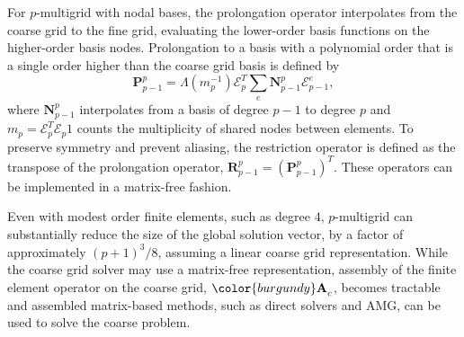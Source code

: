 For $p$-multigrid with nodal bases, the prolongation operator interpolates from the coarse grid to the fine grid, evaluating the lower-order basis functions on the higher-order basis nodes.
Prolongation to a basis with a polynomial order that is a single order higher than the coarse grid basis is defined by
\begin{equation}
\mathbf{P}_{p - 1}^p = \Lambda \left( m_p^{-1} \right) \mathcal{E}_p^T \sum_e \mathbf{N}_{p - 1}^p \mathcal{E}^e_{p - 1},
\label{mg_prolong}
\end{equation}
where $\mathbf{N}_{p - 1}^p$ interpolates from a basis of degree $p - 1$ to degree $p$ and $m_p = \mathcal{E}_p^T \mathcal{E}_p 1$ counts the multiplicity of shared nodes between elements.
To preserve symmetry and prevent aliasing, the restriction operator is defined as the transpose of the prolongation operator, $\mathbf{R}_{p - 1}^p = \left( \mathbf{P}_{p - 1}^p \right)^T$.
These operators can be implemented in a matrix-free fashion.

Even with modest order finite elements, such as degree $4$, $p$-multigrid can substantially reduce the size of the global solution vector, by a factor of approximately $\left( p + 1 \right)^3 / 8$, assuming a linear coarse grid representation.
While the coarse grid solver may use a matrix-free representation, assembly of the finite element operator on the coarse grid, ${\color{burgundy}\mathbf{A}}_c$, becomes tractable and assembled matrix-based methods, such as direct solvers and AMG, can be used to solve the coarse problem.